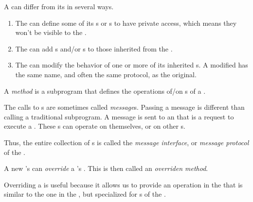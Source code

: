 A  can differ from its  in several ways.
\begin{enumerate}[noitemsep]
\item The  can define some of its s or s to have private access, which means they won't be visible to the .
\item The  can add s and/or s to those inherited from the .
\item The  can modify the behavior of one or more of its inherited s. A modified  has the same name, and often the same protocol, as the original.
\end{enumerate}

\begin{definition}[Method]\label{def:OOP_Method}
  A \emph{method} is a subprogram that defines the operations of/on s of a .
\end{definition}

\begin{definition}[Message]\label{def:OOP_Message}
  The calls to s are sometimes called \emph{message}s.
  Passing a message is different than calling a traditional subprogram.
  A message is sent to an  that is a request to execute a .
  These s can operate on themselves, or on other s.
\end{definition}

\begin{definition}\label{def:OOP_Message_Interface}
  Thus, the entire collection of s is called the \emph{message interface}, or \emph{message protocol} of the .
\end{definition}

\begin{definition}[Override]\label{def:OOP_Override}
  A new 's  can \emph{override} a 's .
  This is then called an \emph{overriden method}.

  Overriding a  is useful because it allows us to provide an operation in the  that is similar to the one in the , but specialized for s of the .
\end{definition}


